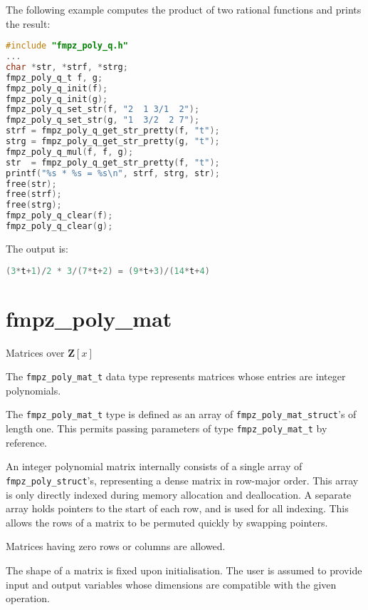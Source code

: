 \documentclass[a4paper,10pt]{book}
\newcommand{\code}{\lstinline}
\begin{document}
The following example computes the product of two rational functions and 
prints the result:
\begin{lstlisting}[language=c]
#include "fmpz_poly_q.h"
...
char *str, *strf, *strg;
fmpz_poly_q_t f, g;
fmpz_poly_q_init(f);
fmpz_poly_q_init(g);
fmpz_poly_q_set_str(f, "2  1 3/1  2");
fmpz_poly_q_set_str(g, "1  3/2  2 7");
strf = fmpz_poly_q_get_str_pretty(f, "t");
strg = fmpz_poly_q_get_str_pretty(g, "t");
fmpz_poly_q_mul(f, f, g);
str  = fmpz_poly_q_get_str_pretty(f, "t");
printf("%s * %s = %s\n", strf, strg, str);
free(str);
free(strf);
free(strg);
fmpz_poly_q_clear(f);
fmpz_poly_q_clear(g);
\end{lstlisting}

The output is:
\begin{lstlisting}[language=c]
(3*t+1)/2 * 3/(7*t+2) = (9*t+3)/(14*t+4)
\end{lstlisting}




\chapter{fmpz\_poly\_mat}
\epigraph{Matrices over $\mathbf{Z}[x]$}{}

The \code{fmpz_poly_mat_t} data type represents matrices whose
entries are integer polynomials.

The \code{fmpz_poly_mat_t} type is defined as an array of
\code{fmpz_poly_mat_struct}'s of length one.
This  permits passing parameters of type \code{fmpz_poly_mat_t}
by reference.  

An integer polynomial matrix internally consists of a single array
of \code{fmpz_poly_struct}'s, representing a dense matrix in
row-major order. This array is only directly indexed
during memory allocation and deallocation. A separate array
holds pointers to the start of each row, and is used for all
indexing. This allows the rows of a matrix to be permuted
quickly by swapping pointers.

Matrices having zero rows or columns are allowed.

The shape of a matrix is fixed upon initialisation.
The user is assumed to provide input and output variables
whose dimensions are compatible with the given operation.
\end{document}
